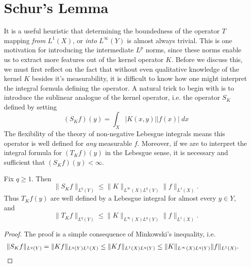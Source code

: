 \section{Schur's Lemma}

It is a useful heuristic that determining the boundedness of the operator $T$ mapping \emph{from} $L^1(X)$, or \emph{into} $L^\infty(Y)$ is almost always trivial. This is one motivation for introducing the intermediate $L^p$ norms, since these norms enable us to extract more features out of the kernel operator $K$. Before we discuss this, we must first reflect on the fact that without even qualitative knowledge of the kernel $K$ besides it's measurability, it is difficult to know how one might interpret the integral formula defining the operator. A natural trick to begin with is to introduce the sublinear analogue of the kernel operator, i.e. the operator $S_K$ defined by setting
%
\[ (S_K f)(y) = \int_X |K(x,y)| |f(x)|\; dx \]
%
The flexibility of the theory of non-negative Lebesgue integrals means this operator is well defined for \emph{any} measurable $f$. Moreover, if we are to interpret the integral formula for $(T_K f)(y)$ in the Lebesgue sense, it is necessary and sufficient that $(S_K f)(y) < \infty$.

\begin{theorem}
  Fix $q \geq 1$. Then
  \[ \| S_K f \|_{L^q(Y)} \leq \| K \|_{L^\infty(X) L^q(Y)} \| f \|_{L^1(X)}. \]
  Thus $T_K f(y)$ are well defined by a Lebesgue integral for almost every $y \in Y$, and
  \[ \| T_K f \|_{L^q(Y)} \leq \| K \|_{L^\infty(X) L^q(Y)} \| f \|_{L^1(X)}. \]
\end{theorem}
\begin{proof}
  The proof is a simple consequence of Minkowski's inequality, i.e.
  \begin{align*}
    \| S_K f \|_{L^q(Y)} &= \| K f \|_{L^q(Y) L^1(X)} \leq \| Kf \|_{L^1(X) L^q(Y)} \leq \| K \|_{L^\infty(X) L^q(Y)} \| f \|_{L^1(X)}. \qedhere
  \end{align*}
\end{proof}

